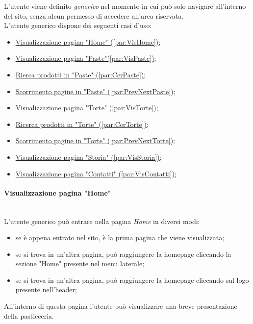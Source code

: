L'utente viene definito \emph{generico} nel momento in cui può solo navigare all'interno del sito, senza alcun permesso di accedere all'area riservata.\\
L'utente generico dispone dei seguenti casi d'uso:
\begin{itemize}
	\item \hyperref[par:VisHome]{ Visualizzazione pagina "Home" (\ref{par:VisHome})};
	\item \hyperref[par:VisPaste]{ Visualizzazione pagina "Paste"(\ref{par:VisPaste})};
	\item \hyperref[par:CerPaste]{ Rierca prodotti in "Paste" (\ref{par:CerPaste})};
	\item \hyperref[par:PrevNextPaste]{ Scorrimento pagine in "Paste" (\ref{par:PrevNextPaste})};
	\item \hyperref[par:VisTorte]{ Visualizzazione pagina "Torte" (\ref{par:VisTorte})};
	\item \hyperref[par:CerTorte]{ Ricerca prodotti in "Torte" (\ref{par:CerTorte})};
	\item \hyperref[par:PrevNextTorte]{ Scorrimento pagine in "Torte" (\ref{par:PrevNextTorte})};
	\item \hyperref[par:VisStoria]{ Visualizzazione pagina "Storia" (\ref{par:VisStoria})};
	\item \hyperref[par:VisContatti]{ Visualizzazione pagina "Contatti" (\ref{par:VisContatti})};
\end{itemize}

\paragraph{Visualizzazione pagina "Home"}\mbox{}\\
\label{par:VisHome}
L'utente generico può entrare nella pagina \emph{Home} in diversi modi:
\begin{itemize}
	\item se è appena entrato nel sito, è la prima pagina che viene visualizzata;
	\item se si trova in un'altra pagina, può raggiungere la homepage cliccando la sezione "Home" presente nel menu laterale;
	\item se si trova in un'altra pagina, può raggiungere la homepage cliccando sul logo presente nell'header;
\end{itemize}
All'interno di questa pagina l'utente può visualizzare una breve presentazione della pasticceria.\\

